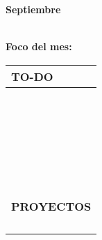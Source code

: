 {\raggedleft
	\fontsize{25}{50}\selectfont
	\textbf{Septiembre}\\
}



	\textbf{\\Foco del mes:} \dotfill
	\renewcommand{\arraystretch}{1.5}\scriptsize
		\begin{longtabu} to \textwidth { X[l]}
		\centering \small{\textbf{TO-DO}} \\
		\toprule
		\makebox{$\square$} \dotfill\\
		\makebox{$\square$} \dotfill\\
		\makebox{$\square$} \dotfill\\
		\makebox{$\square$} \dotfill\\
		\makebox{$\square$} \dotfill\\
		\makebox{$\square$} \dotfill\\
		\makebox{$\square$} \dotfill\\
		\makebox{$\square$} \dotfill\\
		\makebox{$\square$} \dotfill\\
		\makebox{$\square$} \dotfill\\
		\makebox{$\square$} \dotfill\\
		\makebox{$\square$} \dotfill\\
		\makebox{$\square$} \dotfill\\
		\makebox{$\square$} \dotfill\\
		\makebox{$\square$} \dotfill\\
		\makebox{$\square$} \dotfill\\
		\makebox{$\square$} \dotfill\\
		\makebox{$\square$} \dotfill\\
		\makebox{$\square$} \dotfill\\
		\makebox{$\square$} \dotfill\\
		\makebox{$\square$} \dotfill\\
		\makebox{$\square$} \dotfill\\
		\makebox{$\square$} \dotfill\\
		\makebox{$\square$} \dotfill\\
		\makebox{$\square$} \dotfill\\

		\bottomrule

		\\
		\small{\textbf{PROYECTOS}} \\
		\makebox{$\square$} \dotfill\\
		\makebox{$\square$} \dotfill\\
		\makebox{$\square$} \dotfill\\
		\makebox{$\square$} \dotfill\\
	\end{longtabu}


